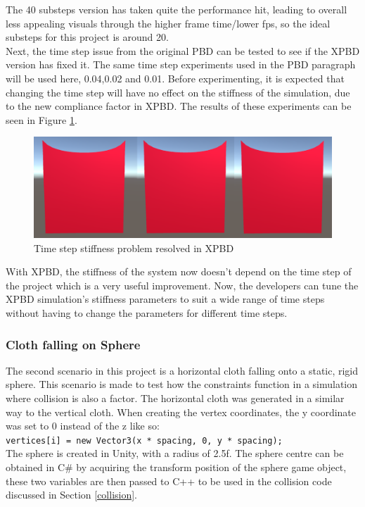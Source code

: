 \documentclass[12pt,a4paper]{article}
\begin{document}
The 40 substeps version has taken quite the performance hit, leading to overall less appealing visuals through the higher frame time/lower fps, so the ideal substeps for this project is around 20. \\

Next, the time step issue from the original PBD can be tested to see if the XPBD version has fixed it. The same time step experiments used in the PBD paragraph will be used here, 0.04,0.02 and 0.01. Before experimenting, it is expected that changing the time step will have no effect on the stiffness of the simulation, due to the new compliance factor in XPBD. The results of these experiments can be seen in Figure \ref{fig:xpbdcomp}.
\begin{figure}
	\centering
	\includegraphics[scale=0.35]{xpbdtscomp.png}
	\caption{Time step stiffness problem resolved in XPBD}
	\label{fig:xpbdcomp}
\end{figure}
With XPBD, the stiffness of the system now doesn't depend on the time step of the project which is a very useful improvement. Now, the developers can tune the XPBD simulation's stiffness parameters to suit a wide range of time steps without having to change the parameters for different time steps.
\subsubsection{Cloth falling on Sphere}
\label{spherescene}
The second scenario in this project is a horizontal cloth falling onto a static, rigid sphere. This scenario is made to test how the constraints function in a simulation where collision is also a factor. The horizontal cloth was generated in a similar way to the vertical cloth. When creating the vertex coordinates, the y coordinate was set to 0 instead of the z like so: \\ \lstinline{vertices[i] = new Vector3(x * spacing, 0, y * spacing);}\\

The sphere is created in Unity, with a radius of 2.5f. The sphere centre can be obtained in C\# by acquiring the transform position of the sphere game object, these two variables are then passed to C++ to be used in the collision code discussed in Section \ref{collision}. \\
\end{document}
